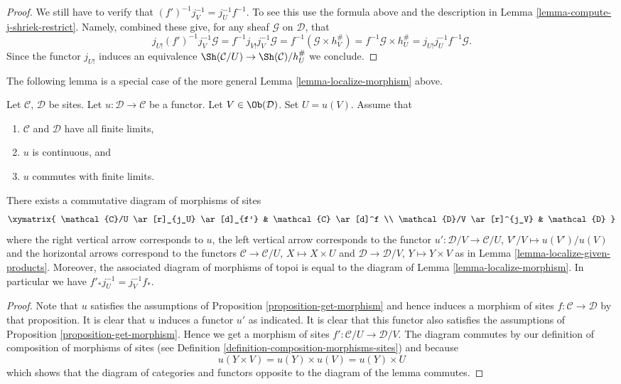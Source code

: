 \begin{proof}
\medskip\noindent
We still have to verify that $(f')^{-1}j_V^{-1} = j_U^{-1}f^{-1}$.
To see this use the formula above and the description
in Lemma \ref{lemma-compute-j-shriek-restrict}. Namely,
combined these give, for any sheaf $\mathcal{G}$ on $\mathcal{D}$, that
$$
j_{U!}(f')^{-1}j_V^{-1}\mathcal{G}
=
f^{-1}j_{V!}j_V^{-1}\mathcal{G}
=
f^{-1}(\mathcal{G} \times h_V^\#)
=
f^{-1}\mathcal{G} \times h_U^\#
=
j_{U!}j_U^{-1}f^{-1}\mathcal{G}.
$$
Since the functor $j_{U!}$ induces an equivalence
$\Sh(\mathcal{C}/U) \to \Sh(\mathcal{C})/h_U^\#$
we conclude.
\end{proof}

\noindent
The following lemma is a special case of the more general
Lemma \ref{lemma-localize-morphism}
above.

\begin{lemma}
\label{lemma-localize-morphism-strong}
Let $\mathcal{C}$, $\mathcal{D}$ be sites.
Let $u : \mathcal{D} \to \mathcal{C}$ be a functor.
Let $V \in \Ob(\mathcal{D})$. Set $U = u(V)$.
Assume that
\begin{enumerate}
\item $\mathcal{C}$ and $\mathcal{D}$ have
all finite limits,
\item $u$ is continuous, and
\item $u$ commutes with finite limits.
\end{enumerate}
There exists a commutative diagram of morphisms of sites
$$
\xymatrix{
\mathcal{C}/U \ar[r]_{j_U} \ar[d]_{f'} & \mathcal{C} \ar[d]^f \\
\mathcal{D}/V \ar[r]^{j_V} & \mathcal{D}
}
$$
where the right vertical arrow corresponds to $u$,
the left vertical arrow corresponds to the
functor $u' : \mathcal{D}/V \to \mathcal{C}/U$, $V'/V \mapsto u(V')/u(V)$
and the horizontal arrows correspond to the functors
$\mathcal{C} \to \mathcal{C}/U$, $X \mapsto X \times U$
and $\mathcal{D} \to \mathcal{D}/V$, $Y \mapsto Y \times V$
as in Lemma \ref{lemma-localize-given-products}.
Moreover, the associated diagram of morphisms of topoi is
equal to the diagram of
Lemma \ref{lemma-localize-morphism}.
In particular we have $f'_*j_U^{-1} = j_V^{-1}f_*$.
\end{lemma}

\begin{proof}
Note that $u$ satisfies the assumptions of
Proposition \ref{proposition-get-morphism} and hence induces
a morphism of sites $f : \mathcal{C} \to \mathcal{D}$ by that proposition.
It is clear that $u$ induces a functor $u'$ as indicated.
It is clear that this functor also satisfies the assumptions of
Proposition \ref{proposition-get-morphism}.
Hence we get a morphism of sites $f' : \mathcal{C}/U \to \mathcal{D}/V$.
The diagram commutes by our definition of composition of morphisms of
sites (see Definition \ref{definition-composition-morphisms-sites})
and because
$$
u(Y \times V) = u(Y) \times u(V) = u(Y) \times U
$$
which shows that the diagram of categories and functors opposite to
the diagram of the lemma commutes.
\end{proof}

